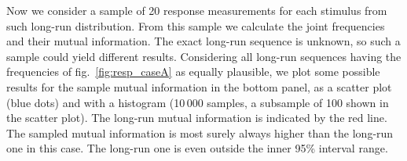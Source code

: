 \documentclass[\ifafour a4paper,12pt,\else a5paper,10pt,\fi%
onecolumn,oneside,article,%
british%
]{memoir}
\theoremstyle{remark}
\theoremstyle{innote}
\renewcommand*{\|}[1][]{\nonscript\,#1\vert\nonscript\;\mathopen{}}
\renewcommand*{\=}{\TextOrMath\texteq\eq}
\newcommand*{\fig}{fig.}%
\begin{document}
Now we consider a sample of 20 response measurements for each stimulus from
such long-run distribution. From this sample we calculate the joint
frequencies and their mutual information. The exact long-run sequence is
unknown, so such a sample could yield different results. Considering all
long-run sequences having the frequencies of \fig~\ref{fig:resp_caseA} as
equally plausible, we plot some possible results for the sample mutual
information in the bottom panel, as a scatter plot (blue dots) and with a
histogram (10\,000 samples, a subsample of 100 shown in the scatter plot).
The long-run mutual information is indicated by the red line. The sampled
mutual information is most surely always higher than the long-run one in
this case. The long-run one is even outside the inner 95\% interval range.

\clearpage
\end{document}
